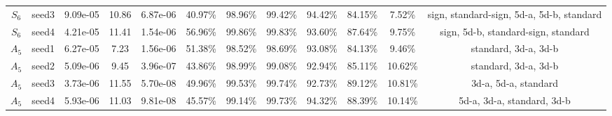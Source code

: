 \begin{tabular}{cccccccccccc}
  $S_{6}$ & seed3 &  9.09e-05 &     10.86 &  6.87e-06 &   40.97\% &   98.96\% &   99.42\% &   94.42\% & 84.15\% &             7.52\% &              sign, standard-sign, 5d-a, 5d-b, standard \\
  $S_{6}$ & seed4 &  4.21e-05 &     11.41 &  1.54e-06 &   56.96\% &   99.86\% &   99.83\% &   93.60\% & 87.64\% &             9.75\% &                    sign, 5d-b, standard-sign, standard \\
  $A_{5}$ & seed1 &  6.27e-05 &      7.23 &  1.56e-06 &   51.38\% &   98.52\% &   98.69\% &   93.08\% & 84.13\% &             9.46\% &                                   standard, 3d-a, 3d-b \\
  $A_{5}$ & seed2 &  5.09e-06 &      9.45 &  3.96e-07 &   43.86\% &   98.99\% &   99.08\% &   92.94\% & 85.11\% &            10.62\% &                                   standard, 3d-a, 3d-b \\
  $A_{5}$ & seed3 &  3.73e-06 &     11.55 &  5.70e-08 &   49.96\% &   99.53\% &   99.74\% &   92.73\% & 89.12\% &            10.81\% &                                   3d-a, 5d-a, standard \\
  $A_{5}$ & seed4 &  5.93e-06 &     11.03 &  9.81e-08 &   45.57\% &   99.14\% &   99.73\% &   94.32\% & 88.39\% &            10.14\% &                             5d-a, 3d-a, standard, 3d-b \\
\bottomrule
\end{tabular}
